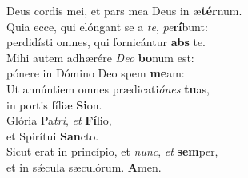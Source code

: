 \oddverse Deus cordis mei, et pars mea Deus in æ\textbf{tér}num.\\
\evenverse Quia ecce, qui elóngant se a \textit{te}, \textit{pe}\textbf{rí}bunt:~\*\\
\evenverse perdidísti omnes, qui fornicántur \textbf{abs} te.\\
\oddverse Mihi autem adhærére \textit{De}\textit{o} \textbf{bo}num est:~\*\\
\oddverse pónere in Dómino Deo spem \textbf{me}am:\\
\evenverse Ut annúntiem omnes prædicati\textit{ó}\textit{nes} \textbf{tu}as,~\*\\
\evenverse in portis fíliæ \textbf{Si}on.\\
\oddverse Glória Pa\textit{tri}, \textit{et} \textbf{Fí}lio,~\*\\
\oddverse et Spirítui \textbf{San}cto.\\
\evenverse Sicut erat in princípio, et \textit{nunc}, \textit{et} \textbf{sem}per,~\*\\
\evenverse et in sǽcula sæculórum. \textbf{A}men.\\
